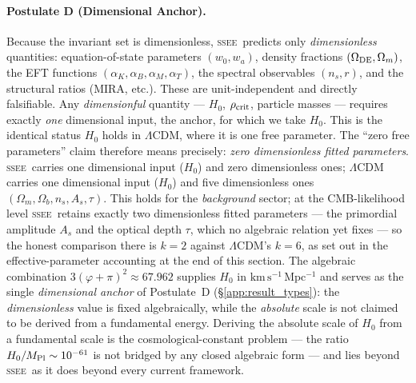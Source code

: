 \documentclass[12pt,a4paper]{article}
\newcommand{\SSEE}{\ifmmode\mathrm{SSEE}\else\textsc{ssee}\fi}
\begin{document}
\paragraph{Postulate D (Dimensional Anchor).}
Because the invariant set is dimensionless, \SSEE\ predicts only
\emph{dimensionless} quantities: equation-of-state parameters
$(w_0,w_a)$, density fractions $(\Omega_{\rm DE},\Omega_{m})$, the EFT
functions $(\alpha_K,\alpha_B,\alpha_M,\alpha_T)$, the spectral observables
$(n_s,r)$, and the structural ratios (MIRA, etc.). These are unit-independent
and directly falsifiable. Any \emph{dimensionful} quantity --- $H_0$,
$\rho_{\rm crit}$, particle masses --- requires exactly \emph{one} dimensional
input, the anchor, for which we take $H_0$. This is the identical status $H_0$
holds in $\Lambda$CDM, where it is one free parameter. The ``zero free
parameters'' claim therefore means precisely: \emph{zero dimensionless fitted
parameters}. \SSEE\ carries one dimensional input ($H_0$) and zero dimensionless
ones; $\Lambda$CDM carries one dimensional input ($H_0$) and five dimensionless
ones $(\Omega_m,\Omega_b,n_s,A_s,\tau)$. This holds for the \emph{background} sector; at the CMB-likelihood
level \SSEE\ retains exactly two dimensionless fitted parameters --- the primordial
amplitude $A_s$ and the optical depth $\tau$, which no algebraic relation yet fixes ---
so the honest comparison there is $k=2$ against $\Lambda$CDM's $k=6$, as set out in the
effective-parameter accounting at the end of this section.
The algebraic combination $3(\varphi+\pi)^2 \approx 67.962$ supplies $H_0$ in
$\mathrm{km\,s^{-1}\,Mpc^{-1}}$ and serves as the single \emph{dimensional anchor}
of Postulate~D (\S\ref{app:result_types}): the \emph{dimensionless} value is fixed
algebraically, while the \emph{absolute} scale is not claimed to be derived from a
fundamental energy.
Deriving the absolute scale of $H_0$ from a fundamental scale is the
cosmological-constant problem --- the ratio $H_0/M_{\rm Pl}\sim10^{-61}$ is not
bridged by any closed algebraic form --- and lies beyond \SSEE\ as it does
beyond every current framework.
\end{document}
